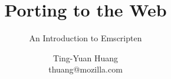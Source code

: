 \documentclass{beamer}
\title{Porting to the Web}
\subtitle{An Introduction to Emscripten}
\author{Ting-Yuan Huang\\{\scriptsize thuang@mozilla.com}}
\date{}
\begin{document}
\begin{frame}[plain]
  \titlepage
\end{frame}
\end{document}
